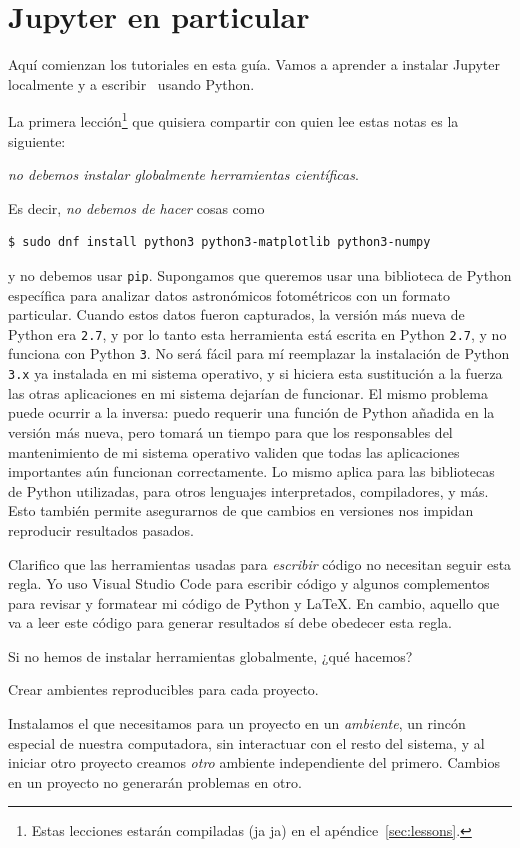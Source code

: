 \section{Jupyter en particular}

Aquí comienzan los tutoriales en esta guía. Vamos a aprender a instalar Jupyter
localmente y a escribir \notebooks~usando Python.

La primera lección\footnote{
  Estas lecciones estarán compiladas (ja ja) en el apéndice~\ref{sec:lessons}.
} que quisiera compartir con quien lee estas notas es la siguiente:
\begin{Center}
  \emph{no debemos instalar globalmente herramientas científicas}.
\end{Center}
Es decir, \emph{no debemos de hacer} cosas como
\begin{verbatim}
$ sudo dnf install python3 python3-matplotlib python3-numpy
\end{verbatim}
y no debemos usar \texttt{pip}.
Supongamos que queremos usar una biblioteca de Python específica para analizar datos
astronómicos fotométricos con un formato particular. Cuando estos
datos fueron capturados, la versión más nueva de Python era \texttt{2.7}, y por lo tanto esta
herramienta está escrita en Python \texttt{2.7}, y no funciona con Python \texttt{3}.
No será fácil para mí reemplazar la instalación de Python \texttt{3.x} ya instalada en mi
sistema operativo, y si hiciera esta sustitución a la fuerza las otras aplicaciones en
mi sistema dejarían de funcionar. El mismo problema puede ocurrir a la inversa: puedo
requerir una función de Python añadida en la versión más nueva, pero tomará un tiempo
para que los responsables del mantenimiento de mi sistema operativo validen que todas
las aplicaciones importantes aún funcionan correctamente. Lo mismo aplica para las
bibliotecas de Python utilizadas, para otros lenguajes interpretados, compiladores, y
más. Esto también permite asegurarnos de que cambios en versiones nos impidan reproducir
resultados pasados.

Clarifico que las herramientas usadas para \emph{escribir} código no necesitan seguir
esta regla. Yo uso Visual Studio Code para escribir código y algunos complementos para
revisar y formatear mi código de Python y \LaTeX. En cambio, aquello que va a leer este
código para generar resultados sí debe obedecer esta regla.

Si no hemos de instalar herramientas globalmente, ¿qué hacemos?
\begin{Center}
  Crear ambientes reproducibles para cada proyecto.
\end{Center}
Instalamos el \software que necesitamos para un proyecto en un \emph{ambiente}, un rincón
especial de nuestra computadora, sin interactuar con el resto del sistema, y al iniciar
otro proyecto creamos \emph{otro} ambiente independiente del primero. Cambios en un
proyecto no generarán problemas en otro.

